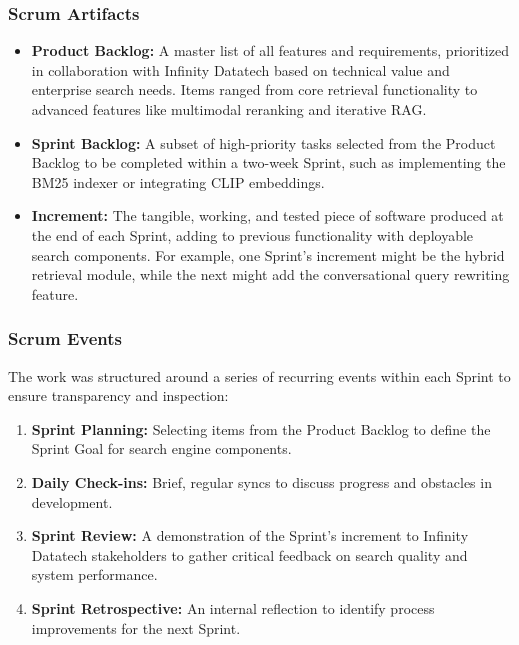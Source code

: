 \documentclass{report}
\begin{document}
\subsubsection{Scrum Artifacts}
\begin{itemize}
\item \textbf{Product Backlog:} A master list of all features and requirements, prioritized in collaboration with Infinity Datatech based on technical value and enterprise search needs. Items ranged from core retrieval functionality to advanced features like multimodal reranking and iterative RAG.
\item \textbf{Sprint Backlog:} A subset of high-priority tasks selected from the Product Backlog to be completed within a two-week Sprint, such as implementing the BM25 indexer or integrating CLIP embeddings.
\item \textbf{Increment:} The tangible, working, and tested piece of software produced at the end of each Sprint, adding to previous functionality with deployable search components. For example, one Sprint's increment might be the hybrid retrieval module, while the next might add the conversational query rewriting feature.
\end{itemize}

\subsubsection{Scrum Events}
The work was structured around a series of recurring events within each Sprint to ensure transparency and inspection:
\begin{enumerate}
\item \textbf{Sprint Planning:} Selecting items from the Product Backlog to define the Sprint Goal for search engine components.
\item \textbf{Daily Check-ins:} Brief, regular syncs to discuss progress and obstacles in development.
\item \textbf{Sprint Review:} A demonstration of the Sprint's increment to Infinity Datatech stakeholders to gather critical feedback on search quality and system performance.
\item \textbf{Sprint Retrospective:} An internal reflection to identify process improvements for the next Sprint.
\end{enumerate}
\end{document}
